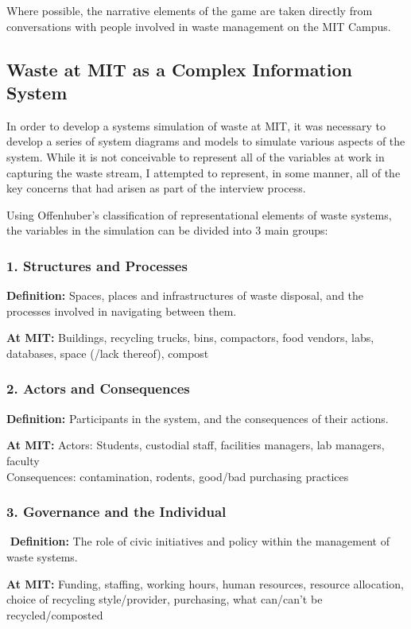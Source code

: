 \documentclass[nofonts,nols,justified,nobib]{tufte-book}
\begin{document}
Where possible, the narrative elements of the game are taken directly from conversations with people involved in waste management on the MIT Campus.

\subsection*{Waste at MIT as a Complex Information System}

In order to develop a systems simulation of waste at MIT, it was necessary to develop a series of system diagrams and models to simulate various aspects of the system. While it is not conceivable to represent all of the variables at work in capturing the waste stream, I attempted to represent, in some manner, all of the key concerns that had arisen as part of the interview process. 

Using Offenhuber's classification of representational elements of waste systems, the variables in the simulation can be divided into 3 main groups:

\subsubsection*{1. Structures and Processes }
\textbf{Definition:} Spaces, places and infrastructures of waste disposal, and the processes involved in navigating between them.

\noindent\textbf{At MIT:} Buildings, recycling trucks, bins, compactors, food vendors, labs, databases, space (/lack thereof), compost
\subsubsection*{2. Actors and Consequences }
\textbf{Definition:} Participants in the system, and the consequences of their actions.

\noindent\textbf{At MIT:}
Actors: Students, custodial staff, facilities managers, lab managers, faculty\\
Consequences: contamination, rodents, good/bad purchasing practices
\subsubsection*{3. Governance and the Individual}
 \textbf{Definition:} The role of civic initiatives and policy within the management of waste systems.

\noindent\textbf{At MIT:} Funding, staffing, working hours, human resources, resource allocation, choice of recycling style/provider, purchasing, what can/can't be recycled/composted
\end{document}
